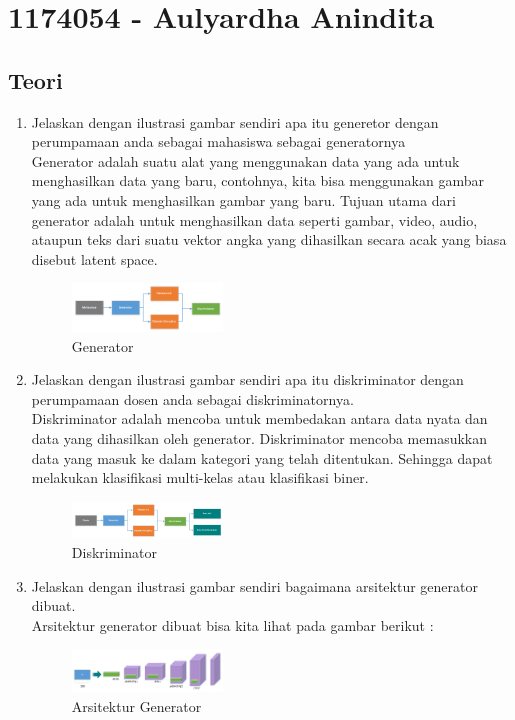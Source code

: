 \section{1174054 - Aulyardha Anindita}

\subsection{Teori}
\begin{enumerate}
\item Jelaskan dengan ilustrasi gambar sendiri apa itu generetor dengan perumpamaan anda sebagai mahasiswa sebagai generatornya\\
Generator adalah suatu alat yang menggunakan data yang ada untuk menghasilkan data yang baru, contohnya, kita bisa menggunakan gambar yang ada untuk menghasilkan gambar yang baru. Tujuan utama dari generator adalah untuk menghasilkan data seperti gambar, video, audio, ataupun teks dari suatu vektor angka yang dihasilkan secara acak yang biasa disebut latent space. 
\begin{figure}[H]
	\includegraphics[width=4cm]{figures/1174054/8/1.png}
	\centering
	\caption{Generator}
\end{figure}

\item Jelaskan dengan ilustrasi gambar sendiri apa itu diskriminator dengan perumpamaan dosen anda sebagai diskriminatornya.\\
Diskriminator adalah mencoba untuk membedakan antara data nyata dan data yang dihasilkan oleh generator. Diskriminator mencoba memasukkan data yang masuk ke dalam kategori yang telah ditentukan. Sehingga dapat melakukan klasifikasi multi-kelas atau klasifikasi biner.
\begin{figure}[H]
	\includegraphics[width=4cm]{figures/1174054/8/2.png}
	\centering
	\caption{Diskriminator}
\end{figure}

\item Jelaskan dengan ilustrasi gambar sendiri bagaimana arsitektur generator dibuat.\\
Arsitektur generator dibuat bisa kita lihat pada gambar berikut :
\begin{figure}[H]
	\includegraphics[width=4cm]{figures/1174054/8/3.png}
	\centering
	\caption{Arsitektur Generator}
\end{figure}


\end{enumerate}
